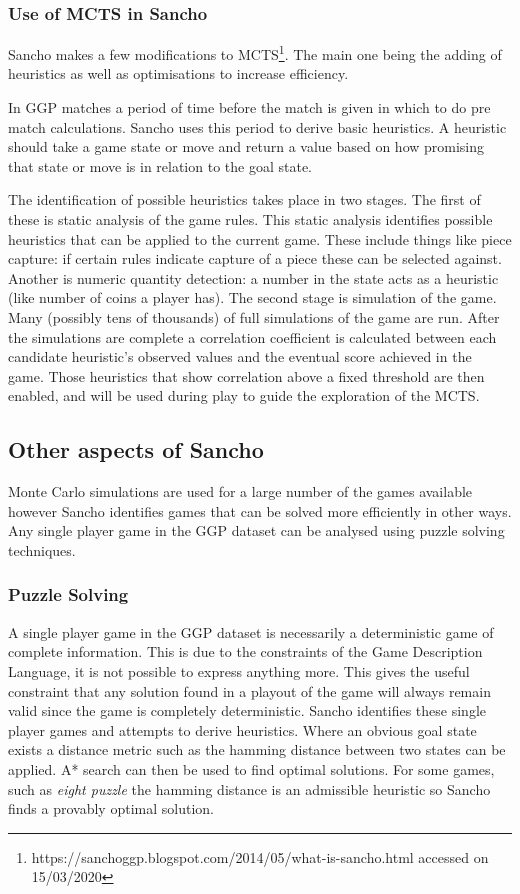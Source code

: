 \subsubsection{Use of MCTS in Sancho}

Sancho makes a few modifications to MCTS\footnote{https://sanchoggp.blogspot.com/2014/05/what-is-sancho.html accessed on 15/03/2020}. The main one being the adding of heuristics as well as optimisations to increase efficiency.

In GGP matches a period of time before the match is given in which to do pre match calculations. Sancho uses this period to derive basic heuristics. A heuristic should take a game state or move and return a value based on how promising that state or move is in relation to the goal state. 

The identification of possible heuristics takes place in two stages. The first of these is static analysis of the game rules. This static analysis identifies possible heuristics that can be applied to the current game. These include things like piece capture: if certain rules indicate capture of a piece these can be selected against. Another is numeric quantity detection: a number in the state acts as a heuristic (like number of coins a player has). The second stage is simulation of the game. Many (possibly tens of thousands) of full simulations of the game are run. After the simulations are complete a correlation coefficient is calculated between each candidate heuristic's observed values and the eventual score achieved in the game. Those heuristics that show correlation above a fixed threshold are then enabled, and will be used during play to guide the exploration of the MCTS.

\subsection{Other aspects of Sancho}

Monte Carlo simulations are used for a large number of the games available however Sancho identifies games that can be solved more efficiently in other ways. Any single player game in the GGP dataset can be analysed using puzzle solving techniques.
\subsubsection{Puzzle Solving}
A single player game in the GGP dataset is necessarily a deterministic game of complete information. This is due to the constraints of the Game Description Language, it is not possible to express anything more. This gives the useful constraint that any solution found in a playout of the game will always remain valid since the game is completely deterministic. Sancho identifies these single player games and attempts to derive heuristics. Where an obvious goal state exists a distance metric such as the hamming distance between two states can be applied. A* search can then be used to find optimal solutions. For some games, such as \textit{eight puzzle} the hamming distance is an admissible heuristic so Sancho finds a provably optimal solution.

